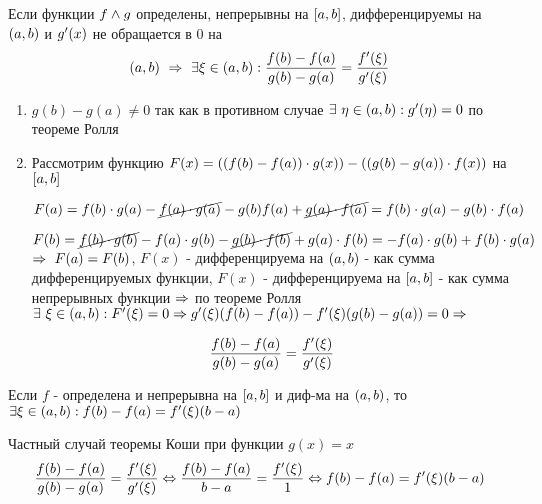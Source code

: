 \begin{proofs}
	Если функции $f \wedge g$ определены, непрерывны на $\left[ a,b\right]$, дифференцируемы на $\left( a,b\right)$ и $g^{\prime}(x)$  не обращается в $0$ на $$\left( a,b\right) \ \Rightarrow \ \exists \xi \in \left( a,b\right): \frac{f(b)-f(a)}{g(b)-g(a)} = \frac{f^{\prime}(\xi)}{g^{\prime}(\xi)}$$

	\begin{dokvo}
		\begin{enumerate}
			\item $g(b) - g(a) \neq 0$ так как в противном случае $\exists \ \eta \in \left( a,b\right): g^{\prime}(\eta) = 0$ по теореме Ролля
			\item Рассмотрим функцию $F(x) = \left( \left( f(b)-f(a)\right)\cdot g(x)\right) - \left( \left( g(b)-g(a)\right)\cdot f(x)\right)$ на $\left[ a,b\right]$

			$F(a) = f(b)\cdot g(a) - \cancel{f(a)\cdot g(a)} - g(b)f(a) + \cancel{g(a)\cdot f(a)} = f(b)\cdot g(a)-g(b)\cdot f(a)$

			$F(b) = \cancel{f(b)\cdot g(b)} - f(a)\cdot g(b) - \cancel{g(b)\cdot f(b)} + g(a)\cdot f(b) = -f(a)\cdot g(b)+f(b)\cdot g(a)$ $\Rightarrow \ F(a) = F(b)$, $F(x)$ - дифференцируема на $\left( a,b\right)$ - как сумма дифференцируемых функции, $F(x)$ - дифференцируема на $\left[ a,b\right]$ - как сумма непрерывных функции $\Rightarrow$ по теореме Ролля $\exists \ \xi \in \left( a,b\right): F^{\prime}(\xi) = 0 \Rightarrow g^{\prime}(\xi)(f(b)-f(a))- f^{\prime}(\xi)(g(b)-g(a)) = 0 \Rightarrow$

			$$\frac{f(b)-f(a)}{g(b)-g(a)} = \frac{f^{\prime}(\xi)}{g^{\prime}(\xi)}$$
		\end{enumerate}
	\end{dokvo}
\end{proofs}

\begin{proofs}
	Если $f$ - определена и непрерывна на $\left[ a,b\right]$ и диф-ма на $\left( a,b\right)$, то $\exists \xi \in \left( a,b\right): f(b) - f(a) = f^{\prime}(\xi)(b-a)$

	\begin{dokvo}
		Частный случай теоремы Коши при функции $g(x) = x$
		$$ \frac{f(b)-f(a)}{g(b)-g(a)} = \frac{f^{\prime}(\xi)}{g^{\prime}(\xi)} \Leftrightarrow \frac{f(b)-f(a)}{b-a} = \frac{f^{\prime}(\xi)}{1} \Leftrightarrow f(b) - f(a) = f^{\prime}(\xi)(b-a)$$
	\end{dokvo}
\end{proofs}
